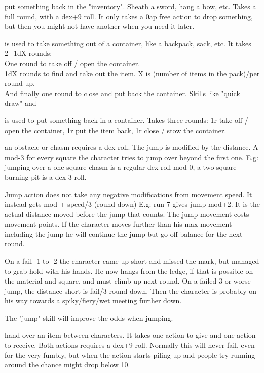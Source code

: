  put something back in the "inventory". Sheath a sword, hang a bow, etc. Takes a full round, with a dex+9 roll. It only takes a 0ap free action to drop something, but then you might not have another when you need it later.


 is used to take something out of a container, like a backpack, sack, etc. It takes 2+1dX rounds: \\
One round to take off / open the container. \\
1dX rounds to find and take out the item. X is (number of items in the pack)/per round up. \\
And finally one round to close and put back the container.
Skills like "quick draw" and


 is used to put something back in a container. Takes three rounds: 1r take off / open the container, 1r put the item back, 1r close / stow the container.


 an obstacle or chasm requires a dex roll.
The jump is modified by the distance. A mod-3 for every square the character tries to jump over beyond the first one. E.g: jumping over a one square chasm is a regular dex roll mod-0, a two square burning pit is a dex-3 roll.

Jump action does not take any negative modifications from movement speed. It instead gets mod + speed/3 (round down) E.g: run 7 gives jump mod+2. It is the actual distance moved before the jump that counts. The jump movement costs movement points. If the character moves further than his max movement including the jump he will continue the jump but go off balance for the next round.

On a fail -1 to -2 the character came up short and missed the mark, but managed to grab hold with his hands. He now hangs from the ledge, if that is possible on the material and square, and must climb up next round. On a failed-3 or worse jump, the distance short is fail/3 round down. Then the character is probably on his way towards a spiky/fiery/wet meeting further down.

The "jump" skill will improve the odds when jumping.


 hand over an item between characters. It takes one action to give and one action to receive. Both actions requires a dex+9 roll. Normally this will never fail, even for the very fumbly, but when the action starts piling up and people try running around the chance might drop below 10.


